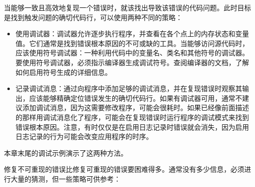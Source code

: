 
当能够一致且高效地复现一个错误时，就该找出导致该错误的代码问题。此时目标是找到触发问题的确切代码行，可以使用两种不同的策略：

\begin{itemize}
\item
使用调试器：调试器允许逐步执行程序，并查看在各个点上的内存状态和变量值。它们通常是找到错误根本原因的不可或缺的工具。当能够访问源代码时，应该使用符号调试器：一种利用代码中的变量名、类名和其他符号的调试器。要使用符号调试器，必须指示编译器生成调试符号。查阅编译器的文档，了解如何启用符号生成的详细信息。

\item
记录调试消息：通过向程序中添加足够的调试消息，并在复现错误时观察其输出，应该能够精确定位错误发生的确切代码行。如果有调试器可用，通常不建议添加调试消息，因为这需要修改程序，可能会很耗时。如果已经像前面描述的那样用调试消息化了程序，可能会在复现错误时运行程序的调试模式来找到错误根本原因。注意，有时仅仅是在启用日志记录时错误就会消失，因为启用日志记录的行为可能会改变应用程序的时序。
\end{itemize}

本章末尾的调试示例演示了这两种方法。


修复不可重现的错误比修复可重现的错误要困难得多。通常没有多少信息，必须进行大量的猜测，但一些策略可供参考：

